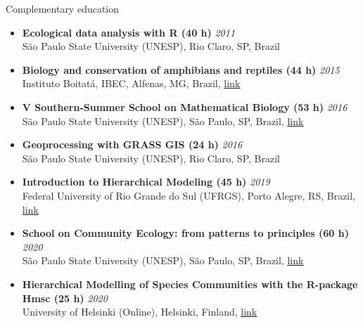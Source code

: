 \documentclass{resume}
\begin{document}

\begin{rSection}{Complementary education}

\begin{itemize} 

\item {\bf Ecological data analysis with R (40 h)} \hfill {\em 2011}\\
São Paulo State University (UNESP), Rio Claro, SP, Brazil

\item {\bf Biology and conservation of amphibians and reptiles (44 h)} \hfill {\em 2015}\\
Instituto Boitatá, IBEC, Alfenas, MG, Brazil, \href{https://www.institutoboitata.org/}{\underline{link}}

\item {\bf V Southern-Summer School on Mathematical Biology (53 h)} \hfill {\em 2016}\\
São Paulo State University (UNESP), São Paulo, SP, Brazil, \href{https://www.ictp-saifr.org/v-southern-summer-school-on-mathematical-biology}{\underline{link}} 

\item {\bf Geoprocessing with GRASS GIS (24 h)} \hfill {\em 2016}\\
São Paulo State University (UNESP), Rio Claro, SP, Brazil

\item {\bf Introduction to Hierarchical Modeling (45 h)} \hfill {\em 2019}\\
Federal University of Rio Grande do Sul (UFRGS), Porto Alegre, RS, Brazil, \href{http://ferrazlab.org/graduate}{\underline{link}}

\item {\bf School on Community Ecology: from patterns to principles (60 h)} \hfill {\em 2020}\\
São Paulo State University (UNESP), São Paulo, SP, Brazil, \href{https://www.ictp-saifr.org/community-ecology-from-patterns-to-principles}{\underline{link}}

\item {\bf Hierarchical Modelling of Species Communities with the R-package Hmsc (25 h)} \hfill {\em 2020}\\
University of Helsinki (Online), Helsinki, Finland, \href{https://www.helsinki.fi/en/researchgroups/statistical-ecology/hmsc}{\underline{link}}


\end{itemize}
\end{rSection}
\end{document}
